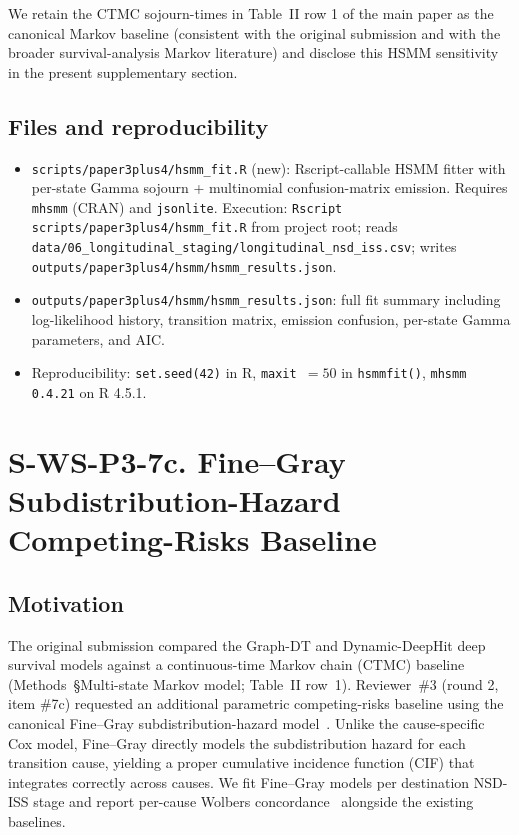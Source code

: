 \documentclass[11pt]{article}
\begin{document}
We retain the CTMC sojourn-times in Table~II row 1 of the main paper as the canonical Markov baseline (consistent with the original submission and with the broader survival-analysis Markov literature) and disclose this HSMM sensitivity in the present supplementary section.

\subsection*{Files and reproducibility}

\begin{itemize}\itemsep=0.2em
  \item \texttt{scripts/paper3plus4/hsmm\_fit.R} (new): Rscript-callable HSMM fitter with per-state Gamma sojourn + multinomial confusion-matrix emission. Requires \texttt{mhsmm} (CRAN) and \texttt{jsonlite}. Execution: \texttt{Rscript scripts/paper3plus4/hsmm\_fit.R} from project root; reads \texttt{data/06\_longitudinal\_staging/longitudinal\_nsd\_iss.csv}; writes \texttt{outputs/paper3plus4/hsmm/hsmm\_results.json}.
  \item \texttt{outputs/paper3plus4/hsmm/hsmm\_results.json}: full fit summary including log-likelihood history, transition matrix, emission confusion, per-state Gamma parameters, and AIC.
  \item Reproducibility: \texttt{set.seed(42)} in R, \texttt{maxit~$=50$} in \texttt{hsmmfit()}, \texttt{mhsmm 0.4.21} on R 4.5.1.
\end{itemize}


\section*{S-WS-P3-7c. Fine--Gray Subdistribution-Hazard Competing-Risks Baseline}

\subsection*{Motivation}

The original submission compared the Graph-DT and Dynamic-DeepHit deep survival models against a continuous-time Markov chain (CTMC) baseline (Methods~\S Multi-state Markov model; Table~II row~1). Reviewer~\#3 (round 2, item \#7c) requested an additional parametric competing-risks baseline using the canonical Fine--Gray subdistribution-hazard model~\cite{finegray1999proportional}. Unlike the cause-specific Cox model, Fine--Gray directly models the subdistribution hazard for each transition cause, yielding a proper cumulative incidence function (CIF) that integrates correctly across causes. We fit Fine--Gray models per destination NSD-ISS stage and report per-cause Wolbers concordance~\cite{wolbers2009prognostic} alongside the existing baselines.
\end{document}
